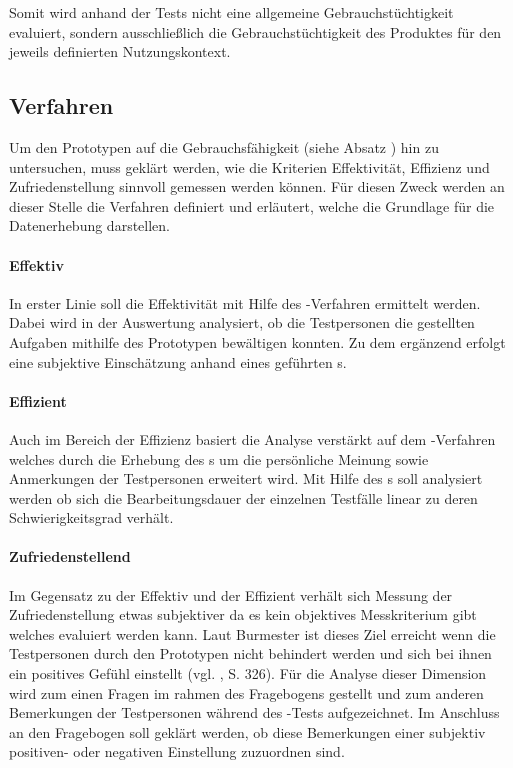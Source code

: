 \documentclass[Bachelorarbeit.tex]{subfiles}
\begin{document}
Somit wird anhand der Tests nicht eine allgemeine Gebrauchstüchtigkeit evaluiert, sondern ausschließlich die Gebrauchstüchtigkeit des Produktes für den jeweils definierten Nutzungskontext.

\subsection{Verfahren}
\label{Verfahren}
Um den Prototypen auf die Gebrauchsfähigkeit (siehe Absatz ) hin zu untersuchen, muss geklärt werden, wie die Kriterien Effektivität, Effizienz und Zufriedenstellung sinnvoll gemessen werden können. 
Für diesen Zweck werden an dieser Stelle die Verfahren definiert und erläutert, welche die Grundlage für die Datenerhebung darstellen.

\paragraph{Effektiv}
In erster Linie soll die Effektivität mit Hilfe des -Verfahren ermittelt werden.
Dabei wird in der Auswertung analysiert, ob die Testpersonen die gestellten Aufgaben mithilfe des Prototypen bewältigen konnten.
Zu dem  ergänzend erfolgt eine subjektive Einschätzung anhand eines geführten s. 

\paragraph{Effizient}
Auch im Bereich der Effizienz basiert die Analyse verstärkt auf dem -Verfahren welches durch die Erhebung des s um die persönliche Meinung sowie Anmerkungen der Testpersonen erweitert wird.
Mit Hilfe des s soll analysiert werden ob sich die Bearbeitungsdauer der einzelnen Testfälle linear zu deren Schwierigkeitsgrad verhält. 

\paragraph{Zufriedenstellend}
Im Gegensatz zu der Effektiv und der Effizient verhält sich Messung der Zufriedenstellung etwas subjektiver da es kein objektives Messkriterium gibt welches evaluiert werden kann.
Laut Burmester ist dieses Ziel erreicht wenn  die Testpersonen durch den Prototypen nicht behindert werden und sich bei ihnen ein positives Gefühl einstellt (vgl. \cite{Burmester}, S. 326). 
Für die Analyse dieser Dimension wird zum einen Fragen im rahmen des Fragebogens gestellt und zum anderen Bemerkungen der Testpersonen während des -Tests aufgezeichnet.
Im Anschluss an den Fragebogen soll geklärt werden, ob diese Bemerkungen einer subjektiv positiven- oder negativen Einstellung zuzuordnen sind.
\end{document}
